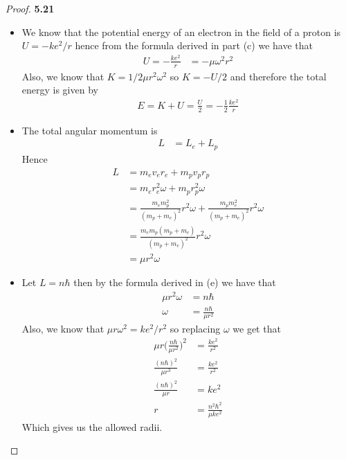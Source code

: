 \documentclass[11pt]{article}
\theoremstyle{definition}
\begin{document}
\begin{proof}{\textbf{5.21}}
\begin{itemize}
\begin{align*}
        \frac{ke^2}{r^2} &= \mu \omega^2 r
    \end{align*}
    \item [(d)] We know that the potential energy of an electron in the field
    of a proton is $U = -ke^2/r$ hence from the formula derived in part (c)
    we have that
    \begin{align*}
        U = -\frac{ke^2}{r} &= -\mu \omega^2 r^2
    \end{align*}
    Also, we know that $K = 1/2 \mu r^2 \omega^2$ so $K = -U/2$ and therefore
    the total energy is given by
    \begin{align*}
        E = K + U = \frac{U}{2} = -\frac{1}{2}\frac{ke^2}{r}
    \end{align*}
    \item [(e)] The total angular momentum is 
    \begin{align*}
        L &= L_e + L_p
    \end{align*}
    Hence
    \begin{align*}
        L &= m_ev_er_e + m_pv_pr_p\\
        &= m_er_e^2\omega + m_pr_p^2 \omega\\
        &= \frac{m_em_p^2}{(m_p + m_e)^2}r^2\omega + \frac{m_pm_e^2}{(m_p + m_e)^2}r^2 \omega\\
        &= \frac{m_em_p(m_p + m_e)}{(m_p + m_e)^2}r^2\omega\\
        &= \mu r^2 \omega
    \end{align*}
    \item [(f)] Let $L = n\hbar$ then by the formula derived in (e) we have
    that
    \begin{align*}
        \mu r^2 \omega &= n\hbar\\
        \omega &= \frac{n\hbar}{\mu r^2}
    \end{align*}
    Also, we know that $\mu r \omega^2 = ke^2/r^2$ so replacing $\omega$ we get
    that
    \begin{align*}
        \mu r \bigg(\frac{n\hbar}{\mu r^2}\bigg)^2 &= \frac{ke^2}{r^2}\\
        \frac{(n\hbar)^2}{\mu r^3} &= \frac{ke^2}{r^2}\\
        \frac{(n\hbar)^2}{\mu r} &= ke^2\\
        r &= \frac{n^2\hbar^2}{\mu ke^2}
    \end{align*}
    Which gives us the allowed radii.
    

\end{itemize}
\end{proof}
\end{document}
